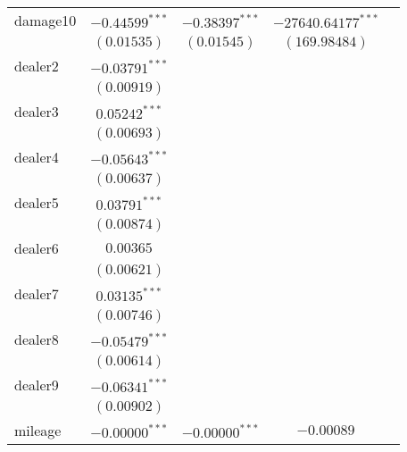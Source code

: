 \begin{table}
\begin{center}
\begin{tabular}{l c c c c}
damage10         & $-0.44599^{***}$ & $-0.38397^{***}$ & $-27640.64177^{***}$ &                 \\
                 & $(0.01535)$      & $(0.01545)$      & $(169.98484)$        &                 \\
dealer2          & $-0.03791^{***}$ &                  &                      &                 \\
                 & $(0.00919)$      &                  &                      &                 \\
dealer3          & $0.05242^{***}$  &                  &                      &                 \\
                 & $(0.00693)$      &                  &                      &                 \\
dealer4          & $-0.05643^{***}$ &                  &                      &                 \\
                 & $(0.00637)$      &                  &                      &                 \\
dealer5          & $0.03791^{***}$  &                  &                      &                 \\
                 & $(0.00874)$      &                  &                      &                 \\
dealer6          & $0.00365$        &                  &                      &                 \\
                 & $(0.00621)$      &                  &                      &                 \\
dealer7          & $0.03135^{***}$  &                  &                      &                 \\
                 & $(0.00746)$      &                  &                      &                 \\
dealer8          & $-0.05479^{***}$ &                  &                      &                 \\
                 & $(0.00614)$      &                  &                      &                 \\
dealer9          & $-0.06341^{***}$ &                  &                      &                 \\
                 & $(0.00902)$      &                  &                      &                 \\
mileage          & $-0.00000^{***}$ & $-0.00000^{***}$ & $-0.00089$           &                 \\

\end{tabular}
\end{center}
\end{table}
